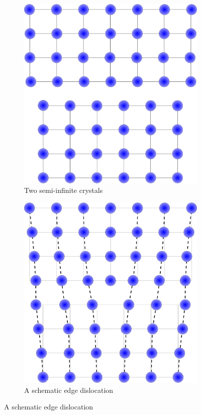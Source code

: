 \begin{figure}
\centering

    \begin{subfigure}{0.4\textwidth}
        \includegraphics[width=\textwidth]{Half_crystals}
        \caption{Two semi-infinite crystals \label{fig:semi_infinite_crystals}}
    \end{subfigure}

    \begin{subfigure}{0.4\textwidth}
        \includegraphics[width=\textwidth]{Edge_Dislocation}
        \caption{A schematic edge dislocation\label{fig:joined_half_crystals}}
    \end{subfigure}


\end{figure}
